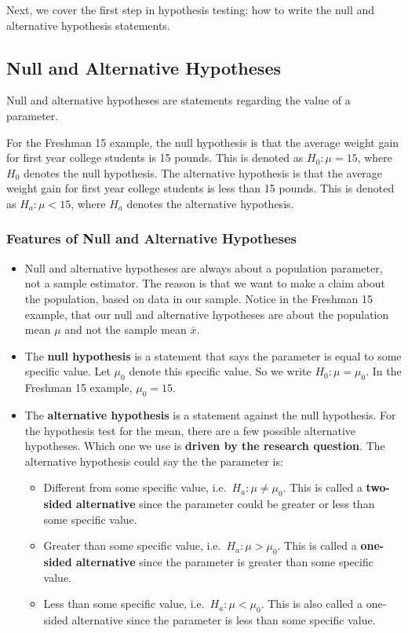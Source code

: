 \documentclass[
]{book}
\begin{document}
Next, we cover the first step in hypothesis testing: how to write the null and alternative hypothesis statements.

\subsection{Null and Alternative Hypotheses}\label{null-and-alternative-hypotheses}

Null and alternative hypotheses are statements regarding the value of a parameter.

For the Freshman 15 example, the null hypothesis is that the average weight gain for first year college students is 15 pounds. This is denoted as \(H_0: \mu = 15\), where \(H_0\) denotes the null hypothesis. The alternative hypothesis is that the average weight gain for first year college students is less than 15 pounds. This is denoted as \(H_a: \mu < 15\), where \(H_a\) denotes the alternative hypothesis.

\subsubsection{Features of Null and Alternative Hypotheses}\label{features-of-null-and-alternative-hypotheses}

\begin{itemize}
\item
  Null and alternative hypotheses are always about a population parameter, not a sample estimator. The reason is that we want to make a claim about the population, based on data in our sample. Notice in the Freshman 15 example, that our null and alternative hypotheses are about the population mean \(\mu\) and not the sample mean \(\bar{x}\).
\item
  The \textbf{null hypothesis} is a statement that says the parameter is equal to some specific value. Let \(\mu_0\) denote this specific value. So we write \(H_0: \mu = \mu_0\). In the Freshman 15 example, \(\mu_0 = 15\).
\item
  The \textbf{alternative hypothesis} is a statement against the null hypothesis. For the hypothesis test for the mean, there are a few possible alternative hypotheses. Which one we use is \textbf{driven by the research question}. The alternative hypothesis could say the the parameter is:

  \begin{itemize}
  \item
    Different from some specific value, i.e.~\(H_a: \mu \neq \mu_0\). This is called a \textbf{two-sided alternative} since the parameter could be greater or less than some specific value.
  \item
    Greater than some specific value, i.e.~\(H_a: \mu > \mu_0\). This is called a \textbf{one-sided alternative} since the parameter is greater than some specific value.
  \item
    Less than some specific value, i.e.~\(H_a: \mu < \mu_0\). This is also called a one-sided alternative since the parameter is less than some specific value.
  \end{itemize}
\end{itemize}
\end{document}
